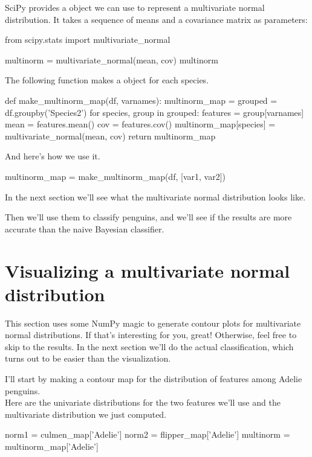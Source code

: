 \documentclass[12pt]{book}
\theoremstyle{exercise}
\begin{document}
SciPy provides a  object
we can use to represent a multivariate normal distribution. It takes a
sequence of means and a covariance matrix as parameters:

\begin{code}
from scipy.stats import multivariate_normal

multinorm = multivariate_normal(mean, cov)
multinorm
\end{code}

The following function makes a
 object for each species.

\begin{code}
def make_multinorm_map(df, varnames):
    multinorm_map = {}
    grouped = df.groupby('Species2')
    for species, group in grouped:
        features = group[varnames]
        mean = features.mean()
        cov = features.cov()
        multinorm_map[species] = multivariate_normal(mean, cov)
    return multinorm_map
\end{code}

And here's how we use it.

\begin{code}
multinorm_map = make_multinorm_map(df, [var1, var2])
\end{code}

In the next section we'll see what the multivariate normal distribution
looks like.

Then we'll use them to classify penguins, and we'll see if the results
are more accurate than the naive Bayesian classifier.


\section{Visualizing a multivariate normal distribution}
\label{visualizing-a-multivariate-normal-distribution}

This section uses some NumPy magic to generate contour plots for
multivariate normal distributions. If that's interesting for you, great!
Otherwise, feel free to skip to the results. In the next section we'll
do the actual classification, which turns out to be easier than the
visualization.

I'll start by making a contour map for the distribution of features
among Adelie penguins.\\
Here are the univariate distributions for the two features we'll use and
the multivariate distribution we just computed.

\begin{code}
norm1 = culmen_map['Adelie']
norm2 = flipper_map['Adelie']
multinorm = multinorm_map['Adelie']
\end{code}
\end{document}
